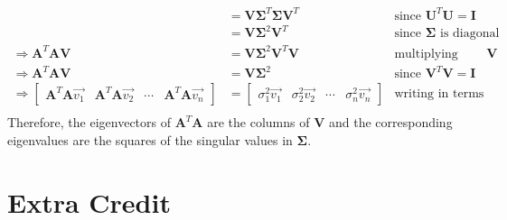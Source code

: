 \documentclass[11pt, fleqn]{article}
\begin{document}
\begin{enumerate}
\begin{align*}
        &= \textbf{V} \boldsymbol{\Sigma}^T \boldsymbol{\Sigma} \textbf{V}^T & \text{since } \textbf{U}^T \textbf{U} = \textbf{I} \\
        &= \textbf{V} \boldsymbol{\Sigma}^2 \textbf{V}^T & \text{since } \boldsymbol{\Sigma} \text{ is diagonal} \\
        \Rightarrow \textbf{A}^T\textbf{A} \textbf{V} &= \textbf{V} \boldsymbol{\Sigma}^2 \textbf{V}^T \textbf{V} & \text{multiplying both sides by } \textbf{V} \\
        \Rightarrow \textbf{A}^T\textbf{A} \textbf{V} &= \textbf{V} \boldsymbol{\Sigma}^2 & \text{since } \textbf{V}^T \textbf{V} = \textbf{I} \\
        \Rightarrow \begin{bmatrix}
            \textbf{A}^T\textbf{A} \vec{v_1} & \textbf{A}^T\textbf{A} \vec{v_2} & \cdots & \textbf{A}^T\textbf{A} \vec{v_n}
        \end{bmatrix} &= \begin{bmatrix}
            \sigma_1^2 \vec{v_1} & \sigma_2^2 \vec{v_2} & \cdots & \sigma_n^2 \vec{v_n}
        \end{bmatrix} & \text{writing in terms of columns} \\
    \end{align*}
    Therefore, the eigenvectors of $\textbf{A}^T \textbf{A}$ are the columns of $\textbf{V}$ and the corresponding eigenvalues are the squares of the singular values in $\boldsymbol{\Sigma}$.
\end{enumerate}

\newpage

\section*{Extra Credit}
\end{document}
